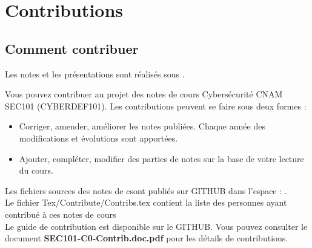 
\section{Contributions}

\subsection{Comment contribuer}

Les notes et les présentations sont réalisés sous . 

Vous pouvez contribuer au projet des notes de cours Cybersécurité CNAM SEC101 (CYBERDEF101). Les contributions peuvent se faire sous deux formes :

\begin{itemize}
  \item Corriger, amender, améliorer les notes publiées. Chaque année des modifications et évolutions sont apportées.
  \item Ajouter, compléter, modifier des parties de notes sur la base de votre lecture du cours.
\end{itemize}

 Les fichiers sources des notes de c\ecours sont publiés sur GITHUB dans l'espace : . 
 \\Le fichier Tex/Contribute/Contribs.tex contient la liste des personnes ayant contribué à ces notes de cours
 \\Le guide de contribution est disponible sur le GITHUB.
Vous pouvez consulter le document \textbf{SEC101-C0-Contrib.doc.pdf} pour les détails de contributions.
